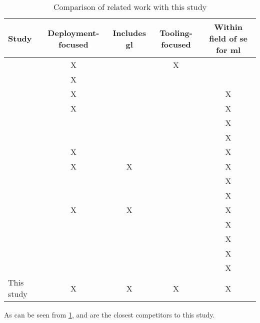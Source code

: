 \begin{table}[h]
\begin{adjustwidth}{-1in}{-1in}
    \centering
    \begin{tabular}{l c c c c}
        Study & Deployment-focused & Includes \acrshort{gl} & Tooling-focused & Within field of \acrshort{se} for \acrshort{ml} \\
        \hline
        \textcite{Shahin2017} & X & & X & \\
        \textcite{Rodriguez2017} & X & & & \\
        \textcite{Baier2019} & X & & & X \\
        \textcite{Paleyes2020} & X & & & X \\
        \textcite{Kumeno2020} & & & & X \\
        \textcite{Nascimento2020} & & & & X \\
        \textcite{Lwakatare2020} & X & & & X \\
        \textcite{Lwakatare2020a} & X & X & & X \\
        \textcite{Serban2020} & & & & X \\
        \textcite{Karamitsos2020} & & & & X \\
        \textcite{John2021} & X & X & & X \\
        \textcite{Giray2021} & & & & X \\
        \textcite{Lorenzoni2021} & & & & X \\
        \textcite{MartinezFernandez2021} & & & & X \\
        \textcite{Serban2021} & & & & X \\
        This study & X & X & X & X \\
    \end{tabular}
    \caption{Comparison of related work with this study}
    \label{tab:related_work_comparison}
\end{adjustwidth}
\end{table}

As can be seen from \cref{tab:related_work_comparison}, \cite{Lwakatare2020a} and \cite{John2021} are the closest competitors to this study.